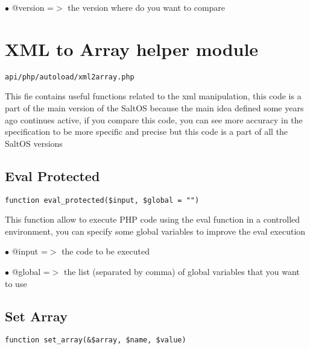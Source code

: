 \documentclass[a4paper]{book}
\begin{document}
\begin{compactitem}
\item[\color{myblue}$\bullet$] @version =$>$ the version where do you want to compare
\end{compactitem}

\hypertarget{toc316}{}
\section{XML to Array helper module}

\begin{lstlisting}
api/php/autoload/xml2array.php
\end{lstlisting}

This fie contains useful functions related to the xml manipulation, this code is a part of the
main version of the SaltOS because the main idea defined some years ago continues active, if you
compare this code, you can see more accuracy in the specification to be more specific and precise
but this code is a part of all the SaltOS versions

\hypertarget{toc317}{}
\subsection{Eval Protected}

\begin{lstlisting}
function eval_protected($input, $global = "")
\end{lstlisting}

This function allow to execute PHP code using the eval function in a controlled
environment, you can specify some global variables to improve the eval execution

\begin{compactitem}
\item[\color{myblue}$\bullet$] @input  =$>$ the code to be executed
\item[\color{myblue}$\bullet$] @global =$>$ the list (separated by comma) of global variables that you want to use
\end{compactitem}

\hypertarget{toc318}{}
\subsection{Set Array}

\begin{lstlisting}
function set_array(&$array, $name, $value)
\end{lstlisting}
\end{document}
